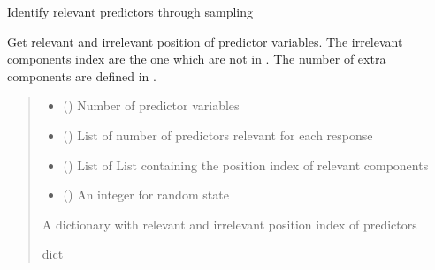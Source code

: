 \documentclass[letterpaper,10pt,english]{sphinxmanual}
\begin{document}

\begin{fulllineitems}
\label{\detokenize{Utilities:pysimrel.utilities.get_relpred}}
\pysigstartsignatures
{}
\pysigstopsignatures
\sphinxAtStartPar
Identify relevant predictors through sampling

\sphinxAtStartPar
Get relevant and irrelevant position of predictor variables. The irrelevant
components index are the one which are not in . The number of extra components
are defined in .
\begin{quote}\begin{description}
\begin{itemize}
\item {} 
\sphinxAtStartPar
{} () \textendash{} Number of predictor variables

\item {} 
\sphinxAtStartPar
{} () \textendash{} List of number of predictors relevant for each response

\item {} 
\sphinxAtStartPar
{} () \textendash{} List of List containing the position index of relevant components

\item {} 
\sphinxAtStartPar
{} () \textendash{} An integer for random state

\end{itemize}

\sphinxAtStartPar
A dictionary with relevant and irrelevant position index of predictors

\sphinxAtStartPar
dict

\end{description}\end{quote}

\end{fulllineitems}
\end{document}
